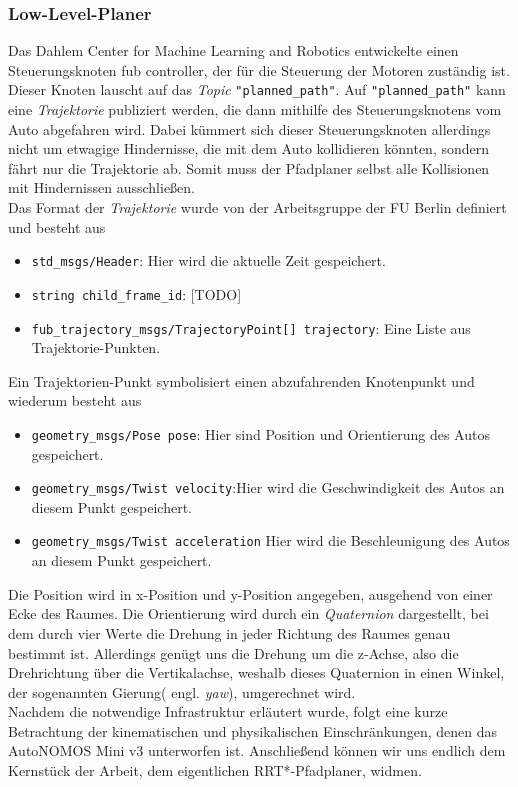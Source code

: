 \subsubsection{Low-Level-Planer}
Das Dahlem Center for Machine Learning and Robotics entwickelte einen Steuerungsknoten fub controller, der für die Steuerung der Motoren zuständig ist.
Dieser Knoten lauscht auf das \textit{Topic} \verb|"planned_path"|. Auf \verb|"planned_path"| kann eine \textit{Trajektorie} publiziert werden, die dann mithilfe des Steuerungsknotens vom Auto abgefahren wird. Dabei kümmert sich dieser Steuerungsknoten allerdings nicht um etwagige Hindernisse, die mit dem Auto kollidieren könnten, sondern fährt nur die Trajektorie ab. Somit muss der Pfadplaner selbst alle Kollisionen mit Hindernissen ausschließen. \\
Das Format der \textit{Trajektorie} wurde von der Arbeitsgruppe der FU Berlin definiert und besteht aus
\begin{itemize}
\item \verb|std_msgs/Header|: Hier wird die aktuelle Zeit gespeichert.
\item \verb|string child_frame_id|: [TODO]
\item \verb|fub_trajectory_msgs/TrajectoryPoint[] trajectory|: Eine Liste aus Trajektorie-Punkten.
\end{itemize}
Ein Trajektorien-Punkt symbolisiert einen abzufahrenden Knotenpunkt und wiederum besteht aus
\begin{itemize}
\item \verb|geometry_msgs/Pose pose|: Hier sind Position und Orientierung des Autos gespeichert.
\item \verb|geometry_msgs/Twist velocity|:Hier wird die Geschwindigkeit des Autos an diesem Punkt gespeichert.
\item \verb|geometry_msgs/Twist acceleration| Hier wird die Beschleunigung des Autos an diesem Punkt gespeichert.
\end{itemize}
Die Position wird in x-Position und y-Position angegeben, ausgehend von einer Ecke des Raumes. Die Orientierung wird durch ein \textit{Quaternion} dargestellt, bei dem durch vier Werte die Drehung in jeder Richtung des Raumes genau bestimmt ist. Allerdings genügt uns die Drehung um die z-Achse, also die Drehrichtung über die Vertikalachse, weshalb dieses Quaternion in einen Winkel, der sogenannten Gierung( engl. \textit{yaw}), umgerechnet wird.
\\
Nachdem die notwendige Infrastruktur erläutert wurde, folgt eine kurze Betrachtung der kinematischen und physikalischen Einschränkungen, denen das AutoNOMOS Mini v3 unterworfen ist. Anschließend können wir uns endlich dem Kernstück der Arbeit, dem eigentlichen RRT*-Pfadplaner, widmen.

